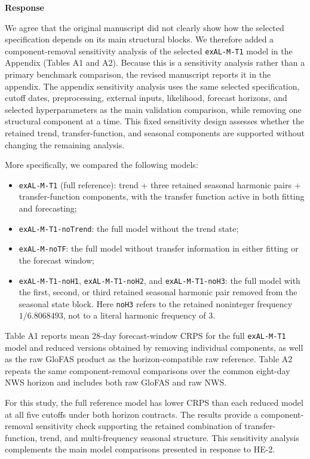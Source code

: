 \documentclass[11pt,letterpaper]{article}
\newcommand{\responseheading}{%
  \vspace{2pt}\noindent\textbf{Response}\par
}
\newenvironment{responsebox}{\begin{mdframed}[style=plainbox]}{\end{mdframed}}
\begin{document}
\responseheading
\begin{responsebox}
We agree that the original manuscript did not clearly show how the selected specification depends on its main structural blocks. We therefore added a component-removal sensitivity analysis of the selected \texttt{exAL-M-T1} model in the Appendix (Tables A1 and A2). Because this is a sensitivity analysis rather than a primary benchmark comparison, the revised manuscript reports it in the appendix. The appendix sensitivity analysis uses the same selected specification, cutoff dates, preprocessing, external inputs, likelihood, forecast horizons, and selected hyperparameters as the main validation comparison, while removing one structural component at a time. This fixed sensitivity design assesses whether the retained trend, transfer-function, and seasonal components are supported without changing the remaining analysis.

More specifically, we compared the following models:
\begin{itemize}
\item \texttt{exAL-M-T1} (full reference): trend + three retained seasonal harmonic pairs + transfer-function components, with the transfer function active in both fitting and forecasting;
\item \texttt{exAL-M-T1-noTrend}: the full model without the trend state;
\item \texttt{exAL-M-noTF}: the full model without transfer information in either fitting or the forecast window;
\item \texttt{exAL-M-T1-noH1}, \texttt{exAL-M-T1-noH2}, and \texttt{exAL-M-T1-noH3}: the full model with the first, second, or third retained seasonal harmonic pair removed from the seasonal state block. Here \texttt{noH3} refers to the retained noninteger frequency \(1/6.8068493\), not to a literal harmonic frequency of 3.
\end{itemize}

\medskip
\noindent Table A1 reports mean 28-day forecast-window CRPS for the full \texttt{exAL-M-T1} model and reduced versions obtained by removing individual components, as well as the raw GloFAS product as the horizon-compatible raw reference. Table A2 repeats the same component-removal comparisons over the common eight-day NWS horizon and includes both raw GloFAS and raw NWS.\par
\medskip

For this study, the full reference model has lower CRPS than each reduced model at all five cutoffs under both horizon contracts. The results provide a component-removal sensitivity check supporting the retained combination of transfer-function, trend, and multi-frequency seasonal structure.
This sensitivity analysis complements the main model comparisons presented in response to HE-2.


\end{responsebox}
\end{document}
